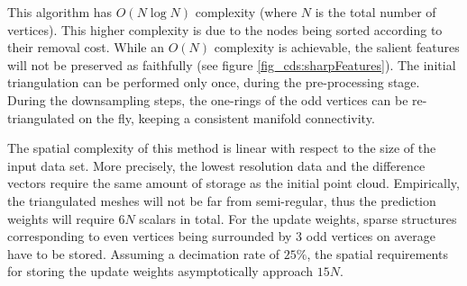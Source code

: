 \documentclass[graybox]{svmult}
\begin{document}
This algorithm has $O(N \log N)$ complexity (where $N$ is the total number of vertices). This higher complexity is due to the 
nodes being sorted according to their removal cost. While an $O(N)$ complexity is achievable, the salient
features will not be preserved as faithfully (see figure \ref{fig_cds:sharpFeatures}). The initial triangulation can be performed only once, during the pre-processing stage. During the downsampling steps, the one-rings of the odd vertices can be re-triangulated on the fly, keeping a consistent manifold connectivity. 

The spatial complexity of this method is linear with respect to the size of the input data set. More precisely, the lowest resolution data and the difference vectors require the same
amount of storage as the initial point cloud. Empirically, the triangulated meshes will not be far from semi-regular, thus the prediction weights will require $6N$ scalars in total. 
For the update weights, sparse structures corresponding to even vertices being surrounded by 3 odd vertices on average have to be stored. Assuming a decimation rate of $25\%$, the
spatial requirements for storing the update weights asymptotically approach $15N$.
\end{document}
